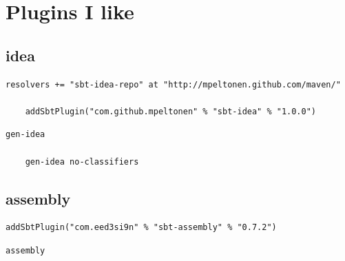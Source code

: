 \documentclass[utf8,utf8x]{beamer}
\begin{document}
\section{Plugins I like}
\frame{\tableofcontents[currentsection]}

\subsection{idea}

\begin{frame}[fragile]

  \begin{lstlisting}[title={plugins.sbt}]
    resolvers += "sbt-idea-repo" at "http://mpeltonen.github.com/maven/"

    addSbtPlugin("com.github.mpeltonen" % "sbt-idea" % "1.0.0")
  \end{lstlisting}

  \begin{lstlisting}[title={usage}]
    gen-idea
    
    gen-idea no-classifiers
  \end{lstlisting}

\end{frame}

\subsection{assembly}

\begin{frame}[fragile]
  \begin{lstlisting}[title={plugins.sbt}]
    addSbtPlugin("com.eed3si9n" % "sbt-assembly" % "0.7.2")
  \end{lstlisting}

  \begin{lstlisting}[title={usage}]
    assembly
  \end{lstlisting}
\end{frame}
\end{document}
